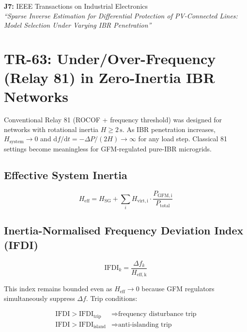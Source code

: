 \documentclass[12pt, a4paper]{report}
\begin{document}
\begin{tcolorbox}[pubbox, title={Publications — TR-62}]
\textbf{J7:} IEEE Transactions on Industrial Electronics\\
\textit{``Sparse Inverse Estimation for Differential Protection of PV-Connected Lines: Model Selection Under Varying IBR Penetration''}
\end{tcolorbox}

\section{TR-63: Under/Over-Frequency (Relay 81) in Zero-Inertia IBR Networks}

\begin{tcolorbox}[gapbox, title={Research Gap — TR-63}]
Conventional Relay 81 (ROCOF + frequency threshold) was designed for networks with rotational inertia $H \ge 2\,\mathrm{s}$. As IBR penetration increases, $H_\mathrm{system} \to 0$ and $\mathrm{d}f/\mathrm{d}t = -\Delta P / (2H) \to \infty$ for any load step. Classical 81 settings become meaningless for GFM-regulated pure-IBR microgrids.
\end{tcolorbox}

\subsection{Effective System Inertia}

\begin{equation}
  H_\mathrm{eff} = H_\mathrm{SG} + \sum_i H_\mathrm{virt,i}\cdot\frac{P_\mathrm{GFM,i}}{P_\mathrm{total}}
\end{equation}

\subsection{Inertia-Normalised Frequency Deviation Index (IFDI)}

\begin{equation}
  \mathrm{IFDI}_k = \frac{\Delta f_k}{H_\mathrm{eff,k}}
\end{equation}

This index remains bounded even as $H_\mathrm{eff} \to 0$ because GFM regulators simultaneously suppress $\Delta f$. Trip conditions:

\begin{align}
  \mathrm{IFDI} > \mathrm{IFDI_{trip}} &\Rightarrow \text{frequency disturbance trip} \\
  \mathrm{IFDI} > \mathrm{IFDI_{island}} &\Rightarrow \text{anti-islanding trip}
\end{align}
\end{document}
